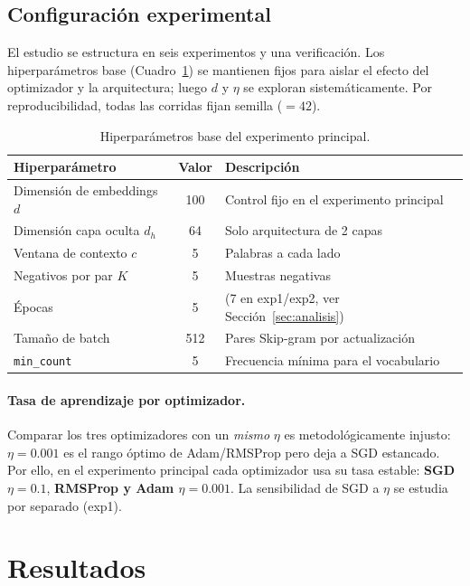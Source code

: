 \documentclass[11pt]{article}
\begin{document}
\subsection{Configuración experimental}
El estudio se estructura en seis experimentos y una verificación. Los hiperparámetros base
(Cuadro~\ref{tab:hparams}) se mantienen fijos para aislar el efecto del optimizador y la
arquitectura; luego $d$ y $\eta$ se exploran sistemáticamente. Por reproducibilidad, todas
las corridas fijan semilla ($=42$).
\begin{table}[H]
\centering
\caption{Hiperparámetros base del experimento principal.}\label{tab:hparams}
\begin{tabular}{lcl}
\toprule
Hiperparámetro & Valor & Descripción \\
\midrule
Dimensión de embeddings $d$ & 100 & Control fijo en el experimento principal \\
Dimensión capa oculta $d_h$ & 64 & Solo arquitectura de 2 capas \\
Ventana de contexto $c$ & 5 & Palabras a cada lado \\
Negativos por par $K$ & 5 & Muestras negativas \\
Épocas & 5 & (7 en exp1/exp2, ver Sección~\ref{sec:analisis}) \\
Tamaño de batch & 512 & Pares Skip-gram por actualización \\
\texttt{min\_count} & 5 & Frecuencia mínima para el vocabulario \\
\bottomrule
\end{tabular}
\end{table}

\paragraph{Tasa de aprendizaje por optimizador.} Comparar los tres optimizadores con un
\emph{mismo} $\eta$ es metodológicamente injusto: $\eta=0.001$ es el rango óptimo de
Adam/RMSProp pero deja a SGD estancado. Por ello, en el experimento principal cada
optimizador usa su tasa estable: \textbf{SGD $\eta=0.1$}, \textbf{RMSProp y Adam
$\eta=0.001$}. La sensibilidad de SGD a $\eta$ se estudia por separado (exp1).

\section{Resultados}\label{sec:resultados}
\end{document}
